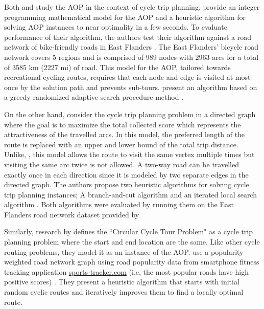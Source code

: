 \documentclass[11pt]{article}
\begin{document}
Both \citeauthor{souffriau2011planning} and \citeauthor{verbeeck2014extension} study the AOP in the context of cycle trip planning. \citeauthor{souffriau2011planning} provide an integer programming mathematical model for the AOP and a heuristic algorithm for solving AOP instances to near optimality in a few seconds. To evaluate performance of their algorithm, the authors test their algorithm against a road network of bike-friendly roads in East Flanders \cite{souffriau2011planning}. The East Flanders' bicycle road network covers 5 regions and is comprised of 989 nodes with 2963 arcs for a total of 3585 km (2227 mi) of road. This model for the AOP, tailored towards recreational cycling routes, requires that each node and edge is visited at most once by the solution path and prevents sub-tours. \citeauthor{souffriau2011planning} present an algorithm based on a greedy randomized adaptive search procedure method \cite{souffriau2011planning}.

On the other hand, \citeauthor{verbeeck2014extension} consider the cycle trip planning problem in a directed graph where the goal is to maximize the total collected score which represents the attractiveness of the travelled arcs. In this model, the preferred length of the route is replaced with an upper and lower bound of the total trip distance. Unlike, \citeauthor{souffriau2011planning}, this model allows the route to visit the same vertex multiple times but visiting the same arc twice is not allowed. A two-way road can be travelled exactly once in each direction since it is modeled by two separate edges in the directed graph. The authors propose two heuristic algorithms for solving cycle trip planning instances; A branch-and-cut algorithm and an iterated local search algorithm \cite{verbeeck2014extension}. Both algorithms were evaluated by running them on the East Flanders road network dataset provided by \citeauthor{souffriau2011planning}

Similarly, research by \citeauthor{bergman2015optimization} defines the ``Circular Cycle Tour Problem" as a cycle trip planning problem where the start and end location are the same. Like other cycle routing problems, they model it as an instance of the AOP. \citeauthor{bergman2015optimization} use a popularity weighted road network graph using road popularity data from smartphone fitness tracking application \href{http://www.sports-tracker.com/}{sports-tracker.com} (i.e, the most popular roads have high positive scores) \cite{bergman2015optimization}. They present a heuristic algorithm that starts with initial random cyclic routes and iteratively improves them to find a locally optimal route.
\end{document}
